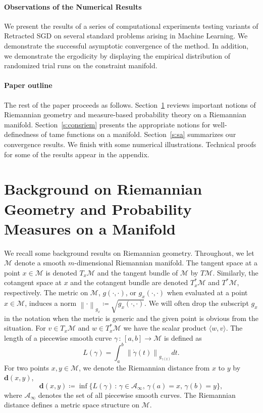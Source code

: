 \documentclass{article}
\newcommand{\CM}{\mathcal{M}}
\newcommand{\bd}{\mathbf{d}}
\newcommand{\norm}[1]{\left\lVert#1\right\rVert}
\begin{document}
\paragraph{Observations of the Numerical Results} 
We present the results of a series of computational experiments testing variants of Retracted SGD on several standard problems arising in Machine Learning. We demonstrate the successful asymptotic convergence of the method. In addition, we demonstrate the ergodicity by displaying the empirical distribution of randomized trial runs on the constraint manifold.  

\paragraph{Paper outline} The rest of the paper proceeds as follows. Section~\ref{s:back} reviews important notions of Riemannian geometry and measure-based probability theory on a Riemannian manifold. Section~\ref{s:consriem} presents the appropriate notions for well-definedness of tame functions on a manifold. Section~\ref{s:sa} summarizes our convergence results. We finish with some numerical illustrations. Technical proofs for some of the results appear in the appendix.




\section{Background on Riemannian Geometry and Probability Measures on a Manifold}\label{s:back}
We recall some background results on Riemannian geometry. Throughout, we let $\CM$ denote a smooth $m$-dimensional Riemannian manifold. The tangent space at a point $x\in\CM$ is denoted $T_x\CM$ and the tangent bundle of $\CM$ by $T\CM$. Similarly, the cotangent space at $x$ and the cotangent bundle are denoted $T^*_x\CM$ and $T^*\CM$, respectively. The metric on $\CM$, $g(\cdot,\cdot)$, or $g_x(\cdot,\cdot)$ when evaluated at a point $x\in\CM$, induces a norm $\norm{\cdot}_{g_x}\coloneqq \sqrt{g_x(\cdot,\cdot)}$. We will often drop the subscript $g_x$ in the notation when the metric is generic and the given point is obvious from the situation. For $v\in T_x\CM$ and $w\in T_x^*\CM$ we have the scalar product $\langle w, v\rangle$. The length of a piecewise smooth curve $\gamma\,:\,[a,b]\to\CM$ is defined as
\begin{equation}
    L(\gamma)=\int_a^b\norm{\dot\gamma(t)}_{g_{\gamma(t)}}dt.
\end{equation}
For two points $x,y\in\CM$, we denote the Riemannian distance from $x$ to $y$ by $\bd(x,y)$, 
\begin{equation}
    \bd(x,y)\coloneqq \inf \{L(\gamma)\,:\,\gamma\in\mathcal{A}_\infty,\,\gamma(a)=x,\,\gamma(b)=y\},
\end{equation}
where $\mathcal{A}_\infty$ denotes the set of all piecewise smooth curves. The Riemannian distance defines a metric space structure on $\CM$. 
\end{document}
